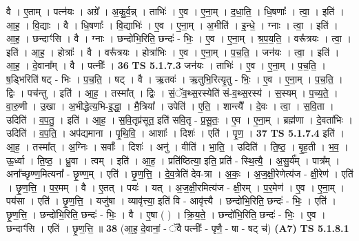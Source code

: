 \documentclass[17pt]{extarticle}
\begin{document}
                  वै । ए॒ताम् । पत्न॑यः । अग्रे᳚ । अ॒कु॒र्व॒न्न् । ताभिः॑ । ए॒व । ए॒ना॒म् । द॒धा॒ति॒ । धि॒षणाः᳚ । त्वा॒ । इति॑ । आ॒ह॒ । वि॒द्याः । वै । धि॒षणाः᳚ । वि॒द्याभिः॑ । ए॒व । ए॒ना॒म् । अ॒भीति॑ । इ॒न्धे॒ । ग्नाः । त्वा॒ । इति॑ । आ॒ह॒ । छन्दाꣳ॑सि । वै । ग्नाः । छन्दो॑भि॒रिति॒ छन्दः॑ - भिः॒ । ए॒व । ए॒ना॒म् । श्र॒प॒य॒ति॒ । वरू᳚त्रयः । त्वा॒ । इति॑ । आ॒ह॒ । होत्राः᳚ । वै । वरू᳚त्रयः । होत्रा॑भिः । ए॒व । ए॒ना॒म् । प॒च॒ति॒ । जन॑यः । त्वा॒ । इति॑ । आ॒ह॒ । दे॒वाना᳚म् । वै । पत्नीः᳚ । \textbf{  36} \newline
                  \newline
                                \textbf{ TS 5.1.7.3} \newline
                  जन॑यः । ताभिः॑ । ए॒व । ए॒ना॒म् । प॒च॒ति॒ । ष॒ड्भिरिति॑ षट् - भिः । प॒च॒ति॒ । षट् । वै । ऋ॒तवः॑ । ऋ॒तुभि॒रित्यृ॒तु - भिः॒ । ए॒व । ए॒ना॒म् । प॒च॒ति॒ । द्विः । पच॑न्तु । इति॑ । आ॒ह॒ । तस्मा᳚त् । द्विः । सं॒ॅव॒थ्स॒रस्येति॑ सं-व॒थ्स॒रस्य॑ । स॒स्यम् । प॒च्य॒ते॒ । वा॒रु॒णी । उ॒खा । अ॒भीद्धेत्य॒भि-इ॒द्धा॒ । मै॒त्रिया᳚ । उपेति॑ । ए॒ति॒ । शान्त्यै᳚ । दे॒वः । त्वा॒ । स॒वि॒ता । उदिति॑ । व॒प॒तु॒ । इति॑ । आ॒ह॒ । स॒वि॒तृप्र॑सूत॒ इति॑ सवि॒तृ - प्र॒सू॒तः॒ । ए॒व । ए॒ना॒म् । ब्रह्म॑णा । दे॒वता॑भिः । उदिति॑ । व॒प॒ति॒ । अप॑द्यमाना । पृ॒थि॒वि॒ । आशाः᳚ । दिशः॑ । एति॑ । पृ॒ण॒ । \textbf{  37} \newline
                  \newline
                                \textbf{ TS 5.1.7.4} \newline
                  इति॑ । आ॒ह॒ । तस्मा᳚त् । अ॒ग्निः । सर्वाः᳚ । दिशः॑ । अनु॑ । वीति॑ । भा॒ति॒ । उदिति॑ । ति॒ष्ठ॒ । बृ॒ह॒ती । भ॒व॒ । ऊ॒र्ध्वा । ति॒ष्ठ॒ । ध्रु॒वा । त्वम् । इति॑ । आ॒ह॒ । प्रति॑ष्ठित्या॒ इति॒ प्रति॑ - स्थि॒त्यै॒ । अ॒सु॒र्य᳚म् । पात्र᳚म् । अना᳚च्छृण्ण॒मित्यना᳚ - छृ॒ण्ण॒म् । एति॑ । छृ॒ण॒त्ति॒ । दे॒व॒त्रेति॑ देव-त्रा । अ॒कः॒ । अ॒ज॒क्षी॒रेणेत्य॑ज - क्षी॒रेण॑ । एति॑ । छृ॒ण॒त्ति॒ । प॒र॒मम् । वै । ए॒तत् । पयः॑ । यत् । अ॒ज॒क्षी॒रमित्य॑ज - क्षी॒रम् । प॒र॒मेण॑ । ए॒व । ए॒ना॒म् । पय॑सा । एति॑ । छृ॒ण॒त्ति॒ । यजु॑षा । व्यावृ॑त्त्या॒ इति॑ वि - आवृ॑त्त्यै । छन्दो॑भि॒रिति॒ छन्दः॑ - भिः॒ । एति॑ । छृ॒ण॒त्ति॒ । छन्दो॑भि॒रिति॒ छन्दः॑ - भिः॒ । वै । ए॒षा ( ) । क्रि॒य॒ते॒ । छन्दो॑भि॒रिति॒ छन्दः॑ - भिः॒ । ए॒व । छन्दाꣳ॑सि । एति॑ । छृ॒ण॒त्ति॒ ॥ \textbf{  38} \newline
                  \newline
                      (आ॒ह॒ दे॒वानां॒ - ॅवै पत्नीः᳚ - पृणै॒ - षा - षट् च॑)  \textbf{(A7)} \newline \newline
                                \textbf{ TS 5.1.8.1} \newline
\end{document}
